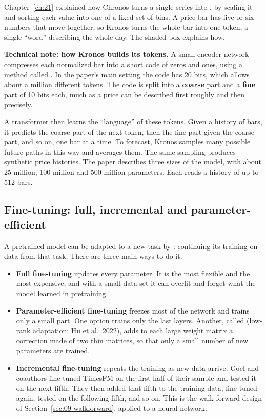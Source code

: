 Chapter~\ref{ch:21} explained how Chronos turns a single series into , by scaling it and sorting each value into one of a fixed set of bins. A price bar has five or six numbers that move together, so Kronos turns the whole bar into one token, a single ``word'' describing the whole day. The shaded box explains how.

\begin{technote}
\textbf{Technical note: how Kronos builds its tokens.} A small encoder network compresses each normalized bar into a short code of zeros and ones, using a method called . In the paper's main setting the code has 20 bits, which allows about a million different tokens. The code is split into a \textbf{coarse} part and a \textbf{fine} part of 10 bits each, much as a price can be described first roughly and then precisely.
\end{technote}

A transformer then learns the ``language'' of these tokens. Given a history of bars, it predicts the coarse part of the next token, then the fine part given the coarse part, and so on, one bar at a time. To forecast, Kronos samples many possible future paths in this way and averages them. The same sampling produces synthetic price histories. The paper describes three sizes of the model, with about 25 million, 100 million and 500 million parameters. Each reads a history of up to 512 bars.

\subsection{Fine-tuning: full, incremental and parameter-efficient}

A pretrained model can be adapted to a new task by : continuing its training on data from that task. There are three main ways to do it.

\begin{itemize}
  \item \textbf{Full fine-tuning} updates every parameter. It is the most flexible and the most expensive, and with a small data set it can overfit and forget what the model learned in pretraining.
  \item \textbf{Parameter-efficient fine-tuning} freezes most of the network and trains only a small part. One option trains only the last layers. Another, called  (low-rank adaptation; Hu et al.\ 2022), adds to each large weight matrix a correction made of two thin matrices, so that only a small number of new parameters are trained.
\item \textbf{Incremental fine-tuning} repeats the training as new data arrive. Goel and coauthors fine-tuned TimesFM on the first half of their sample and tested it on the next fifth. They then added that fifth to the training data, fine-tuned again, tested on the following fifth, and so on. This is the walk-forward design of Section~\ref{sec:09-walkforward}, applied to a neural network.
\end{itemize}

